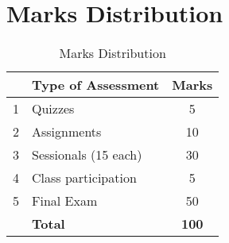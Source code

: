 \documentclass[12pt,a4paper]{article}
\begin{document}
\section{Marks Distribution}
\begin{table}[H]
\begin{center}
\vspace{0.3cm}
	\begin{tabular}{llc}
	\hline \hline
		\rule{0pt}{2.6ex} & \textbf{Type of Assessment} & \textbf{Marks}\\
		\hline
		1 \rule{0pt}{2.6ex} & Quizzes & 5\\
		2 & Assignments& 10\\
		3 & Sessionals (15 each) & 30\\
		4 & Class participation & 5\\
		5 & Final Exam & 50\\
	\hline \hline
	\rule{0pt}{2.6ex} & \textbf{Total} & \textbf{100}\\
	\hline \hline
	\end{tabular}
\end{center}
\label{Marks Distribution}
\caption{Marks Distribution}
\end{table}
\end{document}
